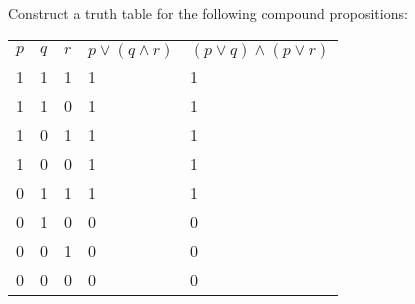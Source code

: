 \documentclass[]{exam}
\begin{document}
  \begin{center}
  \end{center}

  \bigskip

  \begin{questions}
    \question Construct a truth table for the following compound propositions:
      \medskip


      \begin{solution}
        \begin{tabular}{lllll}
          $p$ & $q$ & $r$ & $p \lor (q \land r)$ & $(p \lor q) \land (p \lor r)$ \\
          1 & 1 & 1 & 1                    & 1                           \\
          1 & 1 & 0 & 1                    & 1                           \\
          1 & 0 & 1 & 1                    & 1                           \\
          1 & 0 & 0 & 1                    & 1                           \\
          0 & 1 & 1 & 1                    & 1                           \\
          0 & 1 & 0 & 0                    & 0                           \\
          0 & 0 & 1 & 0                    & 0                           \\
          0 & 0 & 0 & 0                    & 0                          
        \end{tabular}
      \end{solution}


\end{questions}
\end{document}
